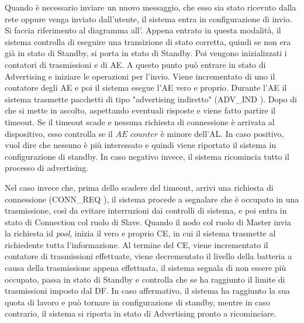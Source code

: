 
Quando è necessario inviare un nuovo messaggio, che esso sia stato ricevuto dalla rete oppure venga inviato dall'utente, il sistema entra in configurazione di invio. Si faccia riferimento al diagramma all'. Appena entrato in questa modalità, il sistema controlla di eseguire una transizione di stato corretta, quindi se non era già in stato di Standby, si porta in stato di Standby. Poi vengono inizializzati i contatori di trasmissioni e di \acs{AE}. A questo punto può entrare in stato di Advertising e iniziare le operazioni per l'invio. Viene incrementato di uno il contatore degli AE e poi il sistema esegue l'\acs{AE} vero e proprio. Durante l'\acs{AE} il sistema trasmette pacchetti di tipo "advertising indiretto" (ADV\_IND \cite{BT-CoreSpec4.0}). Dopo di che si mette in ascolto, aspettando eventuali risposte e viene fatto partire il timeout. Se il timeout scade e nessuna richiesta di connessione è arrivata al dispositivo, esso controlla se il $\textit{AE counter}$ è minore dell'AL. In caso positivo, vuol dire che nessuno è più interessato e quindi viene riportato il sistema in configurazione di standby. In caso negativo invece, il sistema ricomincia tutto il processo di advertising. 

Nel caso invece che, prima dello scadere del timeout, arrivi una richiesta di connessione (CONN\_REQ \cite{BT-CoreSpec4.0}), il sistema procede a segnalare che è occupato in una trasmissione, così da evitare interruzioni dai controlli di sistema, e poi entra in stato di Connection col ruolo di Slave. Quando il nodo col ruolo di Master invia la richiesta id \textit{pool}, inizia il vero e proprio \acf{CE}, in cui il sistema trasmette al richiedente tutta l'informazione. Al termine del \acs{CE}, viene incrementato il contatore di trasmissioni effettuate, viene decrementato il livello della batteria a causa della trasmissione appena effettuata, il sistema segnala di non essere più occupato, passa in stato di Standby e controlla che se ha raggiunto il limite di trasmissioni imposto dal DF. In caso affermativo, il sistema ha raggiunto la sua quota di lavoro e può tornare in configurazione di standby, mentre in caso contrario, il sistema si riporta in stato di Advertising pronto a ricominciare.
\bigskip



